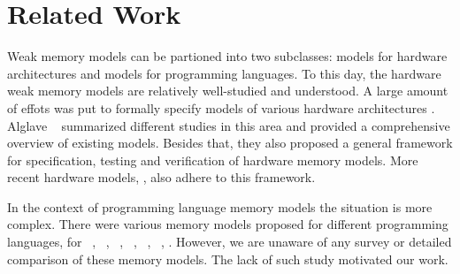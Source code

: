 \section{Related Work}
\label{sec:related}

Weak memory models can be partioned into two subclasses: 
models for hardware architectures and models for programming languages. 
To this day, the hardware weak memory models are relatively well-studied and understood.
A large amount of effots was put to formally specify models of various 
hardware architectures%
\cite{Chong-ASPLOS08, Alglave-DAMP09, Sewell-al:CACM10, Sarkar-al:PLDI11}.
Alglave \etal~\cite{Alglave-al:TOPLAS14} summarized different studies in this area 
and provided a comprehensive overview of existing models.  
Besides that, they also proposed a general framework for specification, 
testing and verification of hardware memory models.
More recent hardware models, \eg \cite{Pulte-al:POPL18}, 
also adhere to this framework.   

In the context of programming language memory models the situation is more complex. 
There were various memory models proposed for different programming languages, \eg
for \Java~\cite{Manson-al:POPL05, Bender-Palsberg:OOPSLA19}, \CPP~\cite{Batty-al:POPL11}, 
\LLVM~\cite{Chakraborty-Vafeiadis:CGO17}, \JS~\cite{Watt-al:PLDI2020}, 
\OCaml~\cite{Manson-al:POPL05}, \Haskell~\cite{Vollmer-al:PPoPP17}, \etc. 
However, we are unaware of any survey or detailed comparison of these memory models.
The lack of such study motivated our work.

